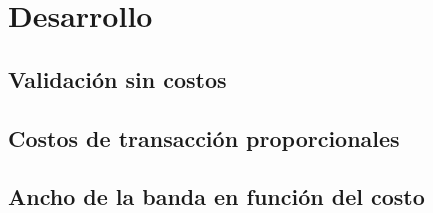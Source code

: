 \section{Desarrollo}
\label{sec:desarrollo}


\subsection{Validación sin costos}
\label{sec:validacion}

\subsection{Costos de transacción proporcionales}
\label{sec:costos}

\subsection{Ancho de la banda en función del costo}
\label{sec:ancho-banda}
